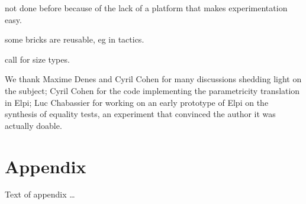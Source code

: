 \documentclass[sigplan,10pt,review]{acmart}\settopmatter{printfolios=true,printccs=false,printacmref=false}
\begin{document}
not done before because of the lack of a platform that makes experimentation
easy.

some bricks are reusable, eg in tactics.

call for size types.

\begin{acks}
We thank Maxime Denes and Cyril Cohen for many discussions shedding light
on the subject; Cyril Cohen for the code implementing the parametricity
translation in Elpi; Luc Chabassier for working on an early prototype of
Elpi on the synthesis of equality tests, an experiment that convinced
the author it was actually doable.
\end{acks}





\appendix
\section{Appendix}

Text of appendix \ldots
\end{document}
